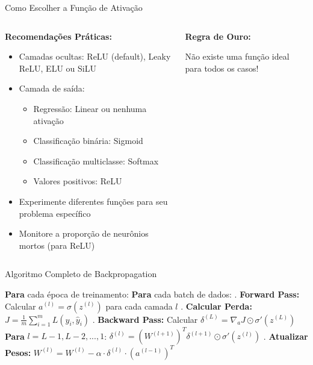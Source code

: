 \documentclass[xcolor=dvipsnames,t,aspectratio=169]{beamer}
\newcommand{\highlight}[1]{{\color{nes_dark_orange} #1}}
\begin{document}
\begin{frame}[c]{Como Escolher a Função de Ativação}
    \begin{columns}[c]
        \begin{column}{0.5\textwidth}
            \textbf{Recomendações Práticas:}
            \begin{itemize}
                \item \highlight{Camadas ocultas:} ReLU (default), Leaky ReLU, ELU ou SiLU
                \item \highlight{Camada de saída:}
                \begin{itemize}
                    \item Regressão: Linear ou nenhuma ativação
                    \item Classificação binária: Sigmoid
                    \item Classificação multiclasse: Softmax
                    \item Valores positivos: ReLU
                \end{itemize}
                \item Experimente diferentes funções para seu problema específico
                \item Monitore a proporção de neurônios mortos (para ReLU)
            \end{itemize}
        \end{column}
        \begin{column}{0.5\textwidth}
        \textbf{Regra de Ouro:}
            \begin{center}
                \highlight{Não existe uma função ideal para todos os casos!}
            \end{center}
        \end{column}
    \end{columns}
\end{frame}

\begin{frame}[c]{Algoritmo Completo de Backpropagation}
    \begin{display}[Pseudocódigo]
        \begin{algorithmic}
            \STATE \textbf{Para} cada época de treinamento:
            \STATE \quad \textbf{Para} cada batch de dados:
            \STATE \quad {}. \textbf{Forward Pass:}
            \STATE \quad \quad \quad Calcular $a^{(l)} = \sigma(z^{(l)})$ para cada camada $l$
            \STATE \quad {}. \textbf{Calcular Perda:}
            \STATE \quad \quad \quad $J = \frac{1}{m}\sum_{i=1}^{m} L(y_i, \hat{y}_i)$
            \STATE \quad {}. \textbf{Backward Pass:}
            \STATE \quad \quad \quad Calcular $\delta^{(L)} = \nabla_a J \odot \sigma'(z^{(L)})$
            \STATE \quad \quad \quad \textbf{Para} $l = L-1, L-2, ..., 1$:
            \STATE \quad \quad \quad \quad $\delta^{(l)} = (W^{(l+1)})^T \delta^{(l+1)} \odot \sigma'(z^{(l)})$
            \STATE \quad {}. \textbf{Atualizar Pesos:}
            \STATE \quad \quad \quad $W^{(l)} = W^{(l)} - \alpha \cdot \delta^{(l)} \cdot (a^{(l-1)})^T$
        \end{algorithmic}
    \end{display}
\end{frame}
\end{document}
